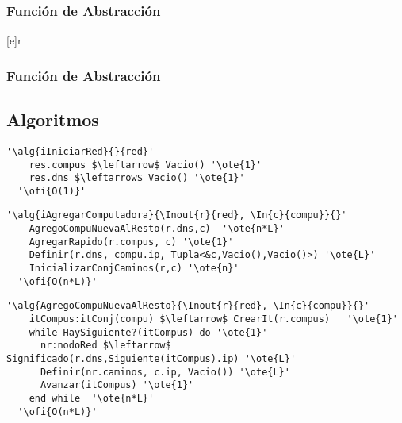 


  \subsubsection{Función de Abstracción}

   [e]{r}{
    }
\subsubsection{Función de Abstracción}




\subsection{Algoritmos}

\lstset{style=alg}

\begin{lstlisting}[mathescape]
  '\alg{iIniciarRed}{}{red}'
    res.compus $\leftarrow$ Vacio() '\ote{1}'
    res.dns $\leftarrow$ Vacio() '\ote{1}'
  '\ofi{O(1)}'
\end{lstlisting}

\begin{lstlisting}[mathescape]
  '\alg{iAgregarComputadora}{\Inout{r}{red}, \In{c}{compu}}{}'
    AgregoCompuNuevaAlResto(r.dns,c)  '\ote{n*L}'
    AgregarRapido(r.compus, c) '\ote{1}'  
    Definir(r.dns, compu.ip, Tupla<&c,Vacio(),Vacio()>) '\ote{L}'
    InicializarConjCaminos(r,c) '\ote{n}'
  '\ofi{O(n*L)}'
\end{lstlisting}

\begin{lstlisting}[mathescape]
  '\alg{AgregoCompuNuevaAlResto}{\Inout{r}{red}, \In{c}{compu}}{}'
    itCompus:itConj(compu) $\leftarrow$ CrearIt(r.compus)   '\ote{1}'
    while HaySiguiente?(itCompus) do '\ote{1}'                                                   
      nr:nodoRed $\leftarrow$ Significado(r.dns,Siguiente(itCompus).ip) '\ote{L}'
      Definir(nr.caminos, c.ip, Vacio()) '\ote{L}'
      Avanzar(itCompus) '\ote{1}'
    end while  '\ote{n*L}'
  '\ofi{O(n*L)}'
\end{lstlisting}

